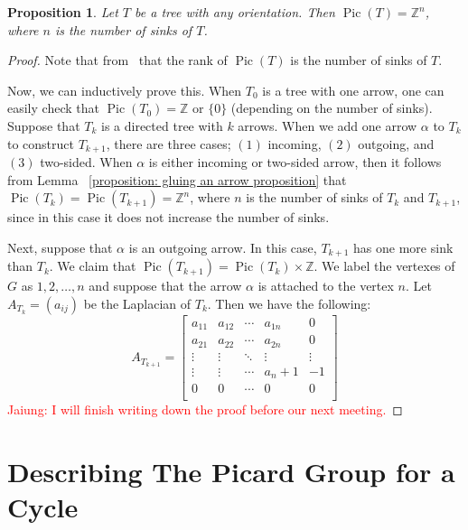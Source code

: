 \documentclass[11pt,reqno]{amsart}
\DeclareMathOperator{\Pic}{Pic}
\theoremstyle{definition}
\theoremstyle{plain}
\newtheorem{pro}[mydef]{\textbf{Proposition}}
\begin{document}
	\begin{pro}
		Let $T$ be a tree with any orientation. Then $\Pic(T)=\mathbb{Z}^n$, where $n$ is the number of sinks of $T$.
	\end{pro}
	\begin{proof}

		Note that from~\cite[Corollary 3.5]{wagner2000critical} that the rank of $\Pic(T)$ is the number of sinks of $T$.

		Now, we can inductively prove this. When $T_0$ is a tree with one arrow, one can easily check that
		$\Pic(T_0) =\mathbb{Z}$ or $\{0\}$ (depending on the number of sinks). Suppose that $T_k$ is a directed tree
		with $k$ arrows. When we add one arrow $\alpha$ to $T_k$ to construct $T_{k+1}$, there are three cases; $(1)$ incoming,
		$(2)$ outgoing, and $(3)$ two-sided. When $\alpha$ is either incoming or two-sided arrow, then it follows from Lemma
		~\ref{proposition: gluing an arrow proposition} that $\Pic(T_k)=\Pic(T_{k+1})=\mathbb{Z}^n$, where $n$ is the
		number of sinks of $T_k$ and $T_{k+1}$, since in this case it does not increase the number of sinks.

		Next, suppose that $\alpha$ is an outgoing arrow. In this case, $T_{k+1}$ has one more sink than $T_{k}$.
		We claim that $\Pic(T_{k+1})=\Pic(T_k)\times \mathbb{Z}$. We label the vertexes of $G$ as $1,2,\dots,n$ and
		suppose that the arrow $\alpha$ is attached to the vertex $n$. Let $A_{T_k}=(a_{ij})$ be the Laplacian of $T_k$.
		Then we have the following:
		\begin{equation}\label{eq: tree case}
			A_{T_{k+1}}=\left[\begin{array}{ccc|c|c}
				a_{11}&a_{12}&\cdots &a_{1n}&0\\
				a_{21}&a_{22}&\cdots &a_{2n}&0\\
				\vdots & \vdots &\ddots & \vdots & \vdots \\ \hline
				\vdots & \vdots & \cdots&a_n+1 & -1\\ \hline
				0&0&\cdots &0&0\\
			\end{array}\right]
		\end{equation}
		\textcolor{red}{Jaiung: I will finish writing down the proof before our next meeting.}
	\end{proof}


\section{Describing The Picard Group for a Cycle}
\end{document}
